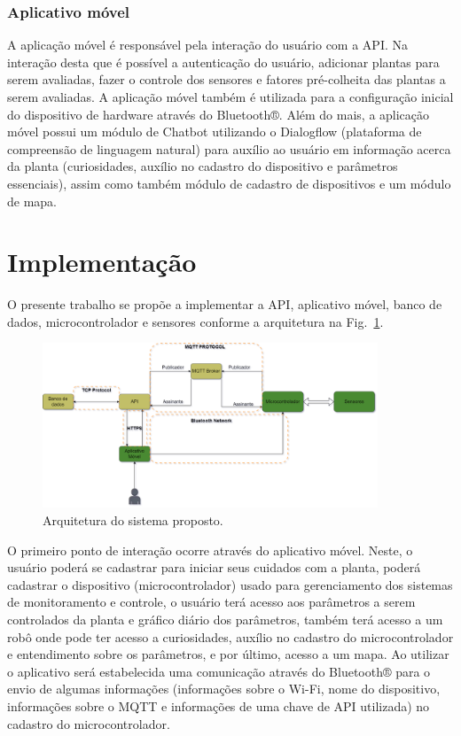 \documentclass[conference]{IEEEtran}
\begin{document}
\subsubsection{Aplicativo móvel}
A aplicação móvel é responsável pela interação do usuário com a API. Na interação desta que é possível a autenticação do usuário, adicionar plantas para serem avaliadas, fazer o controle dos sensores e fatores pré-colheita das plantas a serem avaliadas. A aplicação móvel também é utilizada para a configuração inicial do dispositivo de hardware através do Bluetooth®.
Além do mais, a aplicação móvel possui um módulo de Chatbot utilizando o Dialogflow (plataforma de compreensão de linguagem natural) para auxílio ao usuário em informação acerca da planta (curiosidades, auxílio no cadastro do dispositivo e parâmetros essenciais), assim como também módulo de cadastro de dispositivos e um módulo de mapa.

\section{Implementação}
O presente trabalho se propõe a implementar a API, aplicativo móvel, banco de dados, microcontrolador e sensores conforme a arquitetura na Fig.~\ref{fig:architecture}.

\begin{figure}
    \centering
    \includegraphics[width=10cm]{architecture_proj.png}
    \caption{Arquitetura do sistema proposto.}
    \label{fig:architecture}
\end{figure}

O primeiro ponto de interação ocorre através do aplicativo móvel. Neste, o usuário poderá se cadastrar para iniciar seus cuidados com a planta, poderá cadastrar o dispositivo (microcontrolador) usado para gerenciamento dos sistemas de monitoramento e controle, o usuário terá acesso aos parâmetros a serem controlados da planta e gráfico diário dos parâmetros, também terá acesso a um robô onde pode ter acesso a curiosidades, auxílio no cadastro do microcontrolador e entendimento sobre os parâmetros, e por último, acesso a um mapa. Ao utilizar o aplicativo será estabelecida uma comunicação através do Bluetooth® para o envio de algumas informações (informações sobre o Wi-Fi, nome do dispositivo, informações sobre o MQTT e informações de uma chave de API utilizada) no cadastro do microcontrolador.
\end{document}
